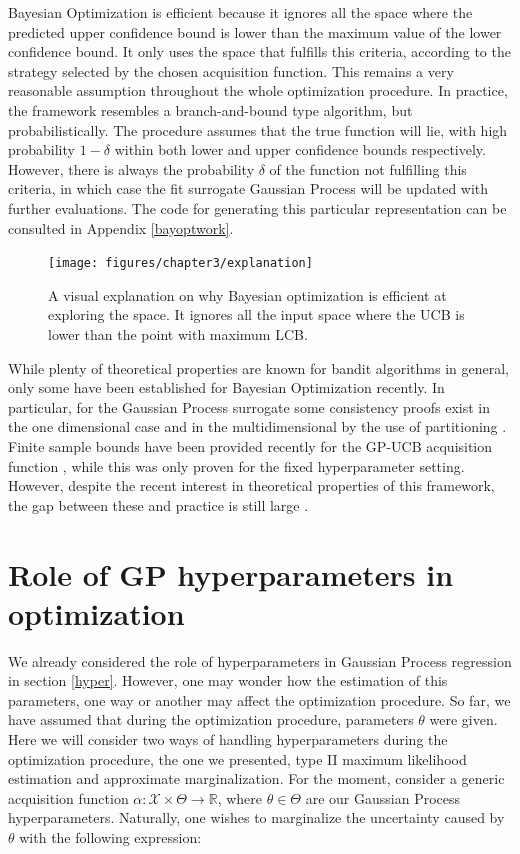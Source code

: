 \documentclass[10pt,a4paper,twoside]{book}
\begin{document}
Bayesian Optimization is efficient because it ignores all the space where the predicted upper confidence bound is lower than the maximum value of the lower confidence bound. It only uses the space that fulfills this criteria, according to the strategy selected by the chosen acquisition function. This remains a very reasonable assumption throughout the whole optimization procedure. In practice, the framework resembles a branch-and-bound type algorithm, but probabilistically.  The procedure assumes that the true function will lie, with high probability $1-\delta$ within both lower and upper confidence bounds respectively. However, there is always the probability $\delta$ of the function not fulfilling this criteria, in which case the fit surrogate Gaussian Process will be updated with further evaluations. The code for generating this particular representation can be consulted in Appendix \ref{bayoptwork}.\\

\begin{figure}
	\caption{A visual explanation on why Bayesian optimization is efficient at exploring the space. It ignores all the input space where the UCB is lower than the point with maximum LCB.}
	\label{fig:explanation}
	\texttt{[image: figures/chapter3/explanation]}
\end{figure}

While plenty of theoretical properties are known for bandit algorithms in general, only some have been established for Bayesian Optimization recently. In particular, for the Gaussian Process surrogate some consistency proofs exist \cite{Locatelli1997} in the one dimensional case and in the multidimensional by the use of partitioning \cite{Ilinskas2002, Vazquez2010}. Finite sample bounds have been provided recently for the GP-UCB acquisition function \cite{Srinivas2009}, while this was only proven for the fixed hyperparameter setting. However, despite the recent interest in theoretical properties of this framework, the gap between these and practice is still large \cite{Snoek2012}.


\section{Role of GP hyperparameters in optimization}

We already considered the role of hyperparameters in Gaussian Process regression in section \ref{hyper}. However, one may wonder how the estimation of this parameters, one way or another may affect the optimization procedure. So far, we have assumed that during the optimization procedure, parameters $\theta$ were given. Here we will consider two ways of handling hyperparameters during the optimization procedure, the one we presented, type II maximum likelihood estimation and approximate marginalization. For the moment, consider a generic acquisition function $\alpha:\mathcal{X} \times \Theta \rightarrow \mathbb{R}$, where $\theta \in \Theta$ are our Gaussian Process hyperparameters. Naturally, one wishes to marginalize the uncertainty caused by $\theta$ with the following expression:
\end{document}
